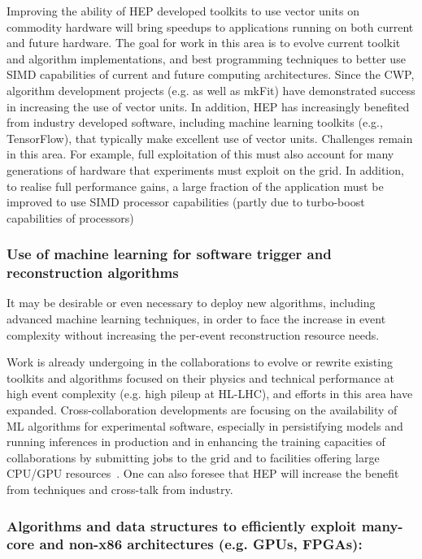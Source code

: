 Improving the ability of HEP developed toolkits to use vector units on
commodity hardware will bring speedups to applications running on both
current and future hardware. The goal for work in this area is to evolve
current toolkit and algorithm implementations, and best programming
techniques to better use SIMD capabilities of current and future
computing architectures. Since the CWP, algorithm development projects
(e.g. \cite{LHCB-FIGURE-2019-002}
as well as mkFit) have demonstrated success in increasing the use of vector
units. In addition, HEP has increasingly benefited from industry
developed software, including machine learning toolkits (e.g.,
TensorFlow), that typically make excellent use of vector units.
Challenges remain in this area. For example, full exploitation of this
must also account for many generations of hardware that experiments must
exploit on the grid. In addition, to realise full performance gains, a
large fraction of the application must be improved to use SIMD processor
capabilities (partly due to turbo-boost capabilities of processors)

\hypertarget{use-of-machine-learning-for-software-trigger-and-reconstruction-algorithms}{%
\subsubsection{Use of machine learning for software trigger and
reconstruction
algorithms}\label{use-of-machine-learning-for-software-trigger-and-reconstruction-algorithms}}

It may be desirable or even necessary to deploy new algorithms,
including advanced machine learning techniques, in order to face the
increase in event complexity without increasing the per-event
reconstruction resource needs.

Work is already undergoing in the collaborations to evolve or rewrite
existing toolkits and algorithms focused on their physics and technical
performance at high event complexity (e.g. high pileup at HL-LHC), and
efforts in this area have expanded. Cross-collaboration developments are
focusing on the availability of ML algorithms for experimental software,
especially in persistifying models and running inferences in production
and in enhancing the
training capacities of collaborations by submitting jobs to the grid and
to facilities offering large CPU/GPU resources~\cite{LWTNN, ONNX}. One can also foresee
that HEP will increase the benefit from techniques and cross-talk from
industry.

\hypertarget{algorithms-and-data-structures-to-efficiently-exploit-many-core-and-non-x86-architectures-e.g.-gpus-fpgas}{%
\subsubsection{\texorpdfstring{Algorithms and data structures to
efficiently exploit many-core and non-x86 architectures (e.g. GPUs,
FPGAs):
}{Algorithms and data structures to efficiently exploit many-core and non-x86 architectures (e.g. GPUs, FPGAs): }}\label{algorithms-and-data-structures-to-efficiently-exploit-many-core-and-non-x86-architectures-e.g.-gpus-fpgas}}

